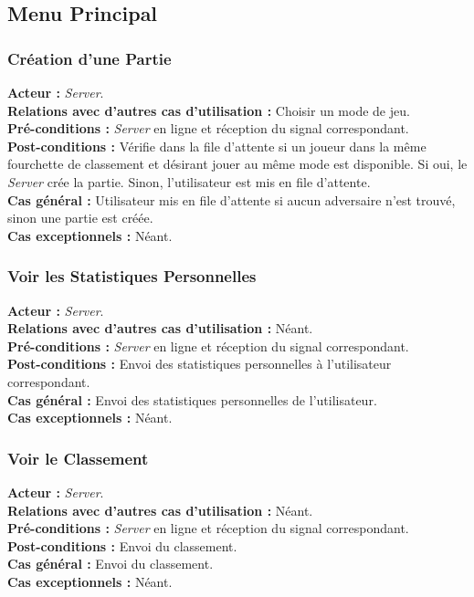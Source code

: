 \documentclass[10pt, a4paper]{article}
\begin{document}
\subsection{Menu Principal}

\subsubsection{Création d'une Partie}
\textbf{Acteur :} \textit{Server}. \\
\textbf{Relations avec d'autres cas d'utilisation :} Choisir un mode de jeu. \\
\textbf{Pré-conditions :} \textit{Server} en ligne et réception du signal correspondant. \\
\textbf{Post-conditions :} Vérifie dans la file d'attente si un joueur dans la même fourchette de classement et désirant jouer au même mode est disponible. Si oui, le \textit{Server} crée la partie. Sinon, l'utilisateur est mis en file d'attente. \\
\textbf{Cas général :} Utilisateur mis en file d'attente si aucun adversaire n'est trouvé, sinon une partie est créée. \\
\textbf{Cas exceptionnels :} Néant. \\

\subsubsection{Voir les Statistiques Personnelles}
\textbf{Acteur :} \textit{Server}. \\
\textbf{Relations avec d'autres cas d'utilisation :} Néant. \\
\textbf{Pré-conditions :} \textit{Server} en ligne et réception du signal correspondant. \\
\textbf{Post-conditions :} Envoi des statistiques personnelles à l'utilisateur correspondant. \\
\textbf{Cas général :} Envoi des statistiques personnelles de l'utilisateur. \\
\textbf{Cas exceptionnels :} Néant. \\

\subsubsection{Voir le Classement}
\textbf{Acteur :} \textit{Server}. \\
\textbf{Relations avec d'autres cas d'utilisation :} Néant. \\
\textbf{Pré-conditions :} \textit{Server} en ligne et réception du signal correspondant. \\
\textbf{Post-conditions :} Envoi du classement. \\
\textbf{Cas général :} Envoi du classement. \\
\textbf{Cas exceptionnels :} Néant. \\
\end{document}
